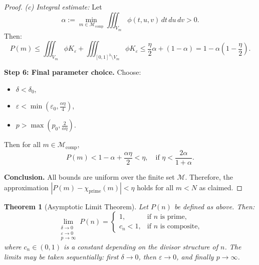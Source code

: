 \documentclass[12pt]{article}
\theoremstyle{definition}
\theoremstyle{plain}
\newtheorem{theorem}[definition]{Theorem}
\theoremstyle{remark}
\begin{document}
\begin{proof}
\textit{(c) Integral estimate:}  
Let
\[
\alpha := \min_{m \in \mathcal{M}_{\mathrm{comp}}} \iiint_{V_m} \phi(t,u,v) \, dt \, du \, dv > 0.
\]
Then:
\[
P(m) \leq \iiint_{V_m} \phi K_\varepsilon + \iiint_{[0,1]^3 \setminus V_m} \phi K_\varepsilon
\leq \frac{\eta}{2} \alpha + (1 - \alpha) = 1 - \alpha\left(1 - \frac{\eta}{2}\right).
\]

\textbf{Step 6: Final parameter choice.}  
Choose:
\begin{itemize}
  \item \( \delta < \delta_0 \),
  \item \( \varepsilon < \min(\varepsilon_0, \frac{\alpha \eta}{4}) \),
  \item \( p > \max(p_0, \frac{2}{\alpha \eta}) \).
\end{itemize}
Then for all \( m \in \mathcal{M}_{\mathrm{comp}} \),
\[
P(m) < 1 - \alpha + \frac{\alpha \eta}{2} < \eta,
\quad \text{if } \eta < \frac{2\alpha}{1 + \alpha}.
\]

\textbf{Conclusion.}  
All bounds are uniform over the finite set \( \mathcal{M} \). Therefore, the approximation \( |P(m) - \chi_{\mathrm{prime}}(m)| < \eta \) holds for all \( m < N \) as claimed.
\end{proof}

\begin{theorem}[Asymptotic Limit Theorem]
\label{thm:asymptotic}
Let \( P(n) \) be defined as above. Then:
\[
\lim_{\substack{\delta \to 0 \\ \varepsilon \to 0 \\ p \to \infty}} P(n) = 
\begin{cases}
1, & \text{if } n \text{ is prime}, \\
c_n < 1, & \text{if } n \text{ is composite},
\end{cases}
\]
where \( c_n \in (0,1) \) is a constant depending on the divisor structure of \( n \). The limits may be taken sequentially: first \( \delta \to 0 \), then \( \varepsilon \to 0 \), and finally \( p \to \infty \).
\end{theorem}
\end{document}
